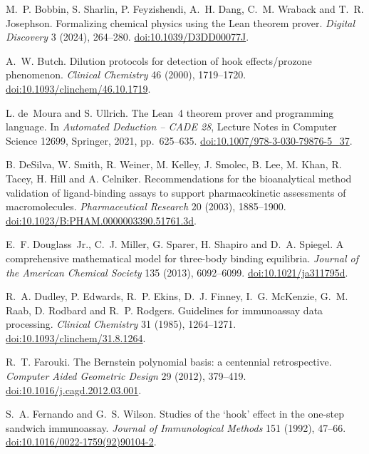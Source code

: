  M.~P. Bobbin, S. Sharlin, P. Feyzishendi, A.~H. Dang, C.~M. Wraback and T.~R. Josephson.
Formalizing chemical physics using the Lean theorem prover.
\emph{Digital Discovery} 3 (2024), 264--280.
\href{https://doi.org/10.1039/D3DD00077J}{doi:10.1039/D3DD00077J}.

 A.~W. Butch.
Dilution protocols for detection of hook effects/prozone phenomenon.
\emph{Clinical Chemistry} 46 (2000), 1719--1720.
\href{https://doi.org/10.1093/clinchem/46.10.1719}{doi:10.1093/clinchem/46.10.1719}.

 L. de~Moura and S. Ullrich.
The Lean~4 theorem prover and programming language.
In \emph{Automated Deduction -- CADE 28}, Lecture Notes in Computer Science 12699, Springer, 2021, pp.~625--635.
\href{https://doi.org/10.1007/978-3-030-79876-5_37}{doi:10.1007/978-3-030-79876-5\_37}.

 B. DeSilva, W. Smith, R. Weiner, M. Kelley, J. Smolec, B. Lee, M. Khan, R. Tacey, H. Hill and A. Celniker.
Recommendations for the bioanalytical method validation of ligand-binding assays to support pharmacokinetic assessments of macromolecules.
\emph{Pharmaceutical Research} 20 (2003), 1885--1900.
\href{https://doi.org/10.1023/B:PHAM.0000003390.51761.3d}{doi:10.1023/B:PHAM.0000003390.51761.3d}.

 E.~F. Douglass~Jr., C.~J. Miller, G. Sparer, H. Shapiro and D.~A. Spiegel.
A comprehensive mathematical model for three-body binding equilibria.
\emph{Journal of the American Chemical Society} 135 (2013), 6092--6099.
\href{https://doi.org/10.1021/ja311795d}{doi:10.1021/ja311795d}.

 R.~A. Dudley, P. Edwards, R.~P. Ekins, D.~J. Finney, I.~G. McKenzie, G.~M. Raab, D. Rodbard and R.~P. Rodgers.
Guidelines for immunoassay data processing.
\emph{Clinical Chemistry} 31 (1985), 1264--1271.
\href{https://doi.org/10.1093/clinchem/31.8.1264}{doi:10.1093/clinchem/31.8.1264}.

 R.~T. Farouki.
The Bernstein polynomial basis: a centennial retrospective.
\emph{Computer Aided Geometric Design} 29 (2012), 379--419.
\href{https://doi.org/10.1016/j.cagd.2012.03.001}{doi:10.1016/j.cagd.2012.03.001}.

 S.~A. Fernando and G.~S. Wilson.
Studies of the `hook' effect in the one-step sandwich immunoassay.
\emph{Journal of Immunological Methods} 151 (1992), 47--66.
\href{https://doi.org/10.1016/0022-1759(92)90104-2}{doi:10.1016/0022-1759(92)90104-2}.

